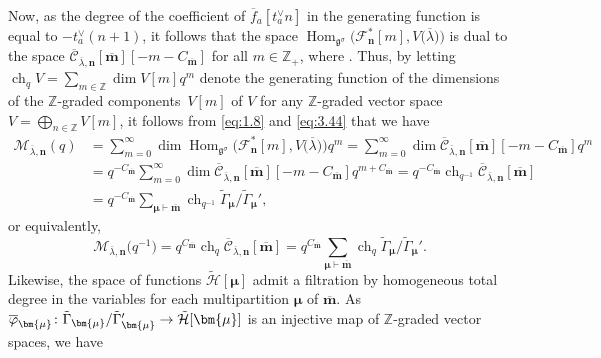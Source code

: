 \documentclass[pdftex]{sigma}
\numberwithin{equation}{section}
\DeclareMathOperator{\Hom}{Hom}
\DeclareMathOperator{\ch}{ch}
\begin{document}
Now, as the degree of the coefficient  of $\overline{f}_a[t_a^{\vee}n]$ in the generating function  is equal to $-t_a^{\vee}(n+1)$, it follows that the space $\Hom_{\mathfrak{g}^{\sigma}}\bigl(\mathcal{F}_{\mathbf{n}}^*[m],V\bigl(\overline{\lambda}\bigr)\bigr)$ is dual to the space $\overline{ \mathcal{C}}_{\overline{ \lambda},\mathbf{n}}[\overline{ \mathbf{m}}][-m-C_{\overline{\mathbf{m}}}]$ for all $m\in \mathbb{Z}_+$, where . Thus, by letting $\ch_q V=\sum_{m\in \mathbb{Z}}\dim V[m]q^m$ denote the generating function of the dimensions of the $\mathbb{Z}$-graded components~$V[m]$ of $V$ for any $\mathbb{Z}$-graded vector space $V=\bigoplus_{n\in \mathbb{Z}} V[m]$, it follows from \eqref{eq:1.8} and \eqref{eq:3.44} that we have
\begin{align*}
\mathcal{M}_{\overline{\lambda},\mathbf{n}}(q)
&=\sum_{m=0}^{\infty}\dim\Hom_{\mathfrak{g}^{\sigma}}\bigl(\mathcal{F}_{\mathbf{n}}^*[m],V\bigl(\overline{\lambda}\bigr)\bigr)q^m=\sum_{m=0}^{\infty}\dim\overline{ \mathcal{C}}_{\overline{ \lambda},\mathbf{n}}[\overline{\mathbf{m}}][-m-C_{\overline{ \mathbf{m}}}]q^m\\
&=q^{-C_{\overline{\mathbf{m}}}}\sum_{m=0}^{\infty}\dim \overline{\mathcal{C}}_{\overline{\lambda},\mathbf{n}}[\overline{\mathbf{m}}][-m-C_{\overline{\mathbf{m}}}]q^{m+C_{ \overline{\mathbf{m}}}}=q^{-C_{\overline{\mathbf{m}}}}\ch_{q^{-1}} \overline{ \mathcal{C}}_{\overline{ \lambda},\mathbf{n}}[\overline{ \mathbf{m}}]\\
&=q^{-C_{\overline{\mathbf{m}}}}\sum_{\bm{\mu}\vdash \overline{\mathbf{m}}}\ch_{q^{-1}}\tilde{\Gamma}_{\bm{\mu}}/\tilde{ \Gamma}_{\bm{\mu}}',
\end{align*}
or equivalently,
\begin{equation}\label{eq:3.46}
\mathcal{M}_{\overline{\lambda},\mathbf{n}}\bigl(q^{-1}\bigr)
=q^{C_{\overline{\mathbf{m}}}}\ch_q\overline{\mathcal{C}}_{ \overline{\lambda},\mathbf{n}}[\overline{\mathbf{m}}]
=q^{C_{\overline{\mathbf{m}}}}\sum_{\bm{\mu}\vdash\overline{ \mathbf{m}}}\ch_q\tilde{\Gamma}_{\bm{\mu}}/\tilde{\Gamma}_{ \bm{\mu}}'.
\end{equation}
Likewise, the space of functions $\tilde{\mathcal{H}}[\bm{ \mu}]$ admit a filtration by homogeneous total degree in the variables  for each multipartition $\bm{\mu}$ of $\overline{\mathbf{m}}$. As $\overline{\varphi}_{\bm{\mu}}\colon \tilde{\Gamma}_{\bm{\mu}}/\tilde{\Gamma}_{\bm{\mu}}'\to \smash{\tilde{\mathcal{H}}[\bm{\mu}]}$ is an injective map of $\mathbb{Z}$-graded vector spaces, we have
\end{document}
